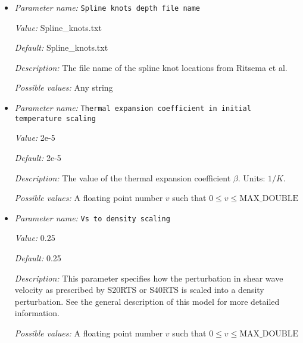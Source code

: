 \begin{itemize}
{\it Value:} false


{\it Default:} false


{\it Description:} Option to use a lower maximum order when reading the data file of spherical harmonic coefficients. This is probably used for the faster tests or when the users only want to see the spherical harmonic pattern up to a certain order.


{\it Possible values:} A boolean value (true or false)
\item {\it Parameter name:} {\tt Spline knots depth file name}
\label{parameters:Initial temperature model/S40RTS perturbation/Spline knots depth file name}


{\it Value:} Spline\_knots.txt


{\it Default:} Spline\_knots.txt


{\it Description:} The file name of the spline knot locations from Ritsema et al.


{\it Possible values:} Any string
\item {\it Parameter name:} {\tt Thermal expansion coefficient in initial temperature scaling}
\label{parameters:Initial temperature model/S40RTS perturbation/Thermal expansion coefficient in initial temperature scaling}


{\it Value:} 2e-5


{\it Default:} 2e-5


{\it Description:} The value of the thermal expansion coefficient $\beta$. Units: $1/K$.


{\it Possible values:} A floating point number $v$ such that $0 \leq v \leq \text{MAX\_DOUBLE}$
\item {\it Parameter name:} {\tt Vs to density scaling}
\label{parameters:Initial temperature model/S40RTS perturbation/Vs to density scaling}


{\it Value:} 0.25


{\it Default:} 0.25


{\it Description:} This parameter specifies how the perturbation in shear wave velocity as prescribed by S20RTS or S40RTS is scaled into a density perturbation. See the general description of this model for more detailed information.


{\it Possible values:} A floating point number $v$ such that $0 \leq v \leq \text{MAX\_DOUBLE}$
\end{itemize}

